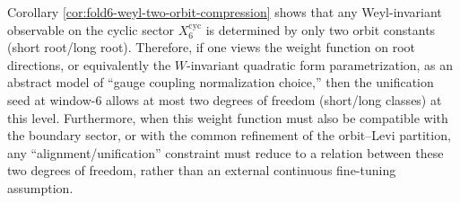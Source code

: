\begin{remark}\label{rem:fold6-weyl-two-orbit-two-dof}
Corollary \ref{cor:fold6-weyl-two-orbit-compression} shows that any Weyl-invariant observable on the cyclic sector \(X^{\mathrm{cyc}}_6\) is determined by only two orbit constants (short root/long root).
Therefore, if one views the weight function on root directions, or equivalently the \(W\)-invariant quadratic form parametrization, as an abstract model of ``gauge coupling normalization choice,''
then the unification seed at window-\(6\) allows at most two degrees of freedom (short/long classes) at this level.
Furthermore, when this weight function must also be compatible with the boundary sector, or with the common refinement of the orbit--Levi partition,
any ``alignment/unification'' constraint must reduce to a relation between these two degrees of freedom, rather than an external continuous fine-tuning assumption.
\end{remark}

